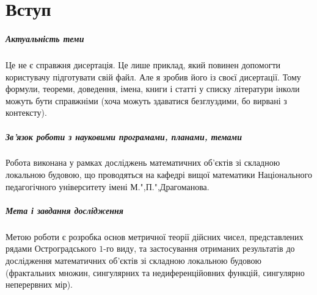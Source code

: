 \chapter*{Вступ}


\paragraph{Актуальність теми}

Це не є справжня дисертація. Це лише приклад, який повинен
допомогти користувачу підготувати свій файл. Але я зробив його із
своєї дисертації. Тому формули, теореми, доведення, імена, книги і
статті у списку літератури інколи можуть бути справжніми (хоча
можуть здаватися безглуздими, бо вирвані з контексту).


\paragraph{Зв'язок роботи з науковими програмами, планами, темами}

Робота виконана у рамках досліджень математичних об'єктів зі
складною локальною будовою, що проводяться на кафедрі вищої
математики Національного педагогічного університету імені
М.",П.",Драгоманова.


\paragraph{Мета і завдання дослідження}

Метою роботи є розробка основ метричної теорії дійсних чисел,
представлених рядами Остроградського $1$-го виду, та застосування
отриманих результатів до дослідження математичних об'єктів зі
складною локальною будовою (фрактальних множин, сингулярних та
недиференційовних функцій, сингулярно неперервних мір).

